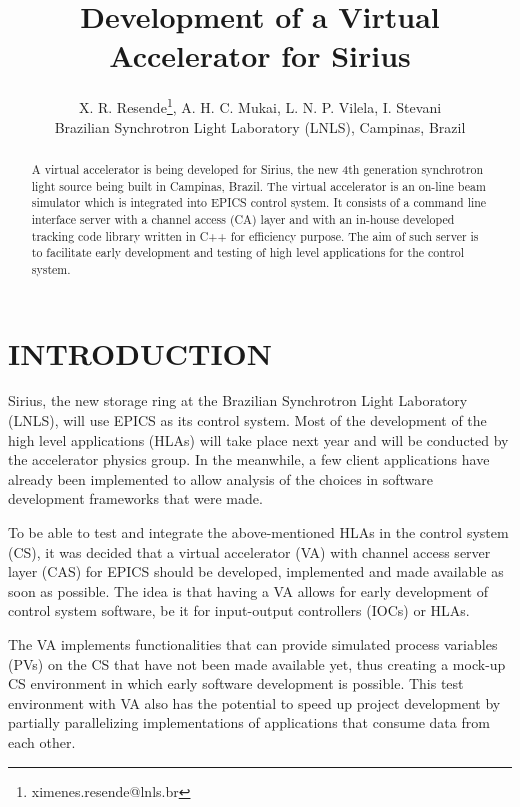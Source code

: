 \documentclass[a4paper,
              ]{jacow}
\begin{document}
\title{Development of a Virtual Accelerator for Sirius}
\author{X. R. Resende\thanks{ximenes.resende@lnls.br}, A. H. C. Mukai, L. N. P. Vilela, I. Stevani \\ Brazilian Synchrotron Light Laboratory (LNLS), Campinas, Brazil}
\maketitle

\begin{abstract}
A virtual accelerator is being developed for Sirius, the new 4th generation synchrotron light source being built in Campinas, Brazil\cite{sirius_status}.
The virtual accelerator is an on-line beam simulator which is integrated into EPICS control system.
It consists of a command line interface server with a channel access (CA) layer and with an in-house developed tracking code library written in C++ for efficiency purpose.
The aim of such server is to facilitate early development and testing of high level applications for the control system.
\end{abstract}

\section{INTRODUCTION}

Sirius, the new storage ring at the Brazilian Synchrotron Light Laboratory (LNLS), will use EPICS as its control system.
Most of the development of the high level applications (HLAs) will take place next year and will be conducted by the accelerator physics group.
In the meanwhile, a few client applications have already been implemented to allow analysis of the choices in software development frameworks\cite{sirius_hla} that were made.

To be able to test and integrate the above-mentioned HLAs in the control system (CS), it was decided that a virtual accelerator (VA) with channel access server layer (CAS) for EPICS should be developed, implemented and made available as soon as possible.
The idea is that having a VA allows for early development of control system software, be it for input-output controllers (IOCs) or HLAs.

The VA implements functionalities that can provide si\-mu\-la\-ted process variables (PVs) on the CS that have not been made available yet, thus creating a mock-up CS environment in which early software development is possible.
This test environment with VA also has the potential to speed up project development by partially parallelizing implementations of applications that consume data from each other.
\end{document}

